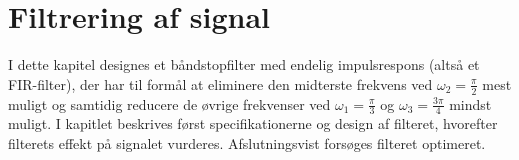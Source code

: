 \chapter{Filtrering af signal}
I dette kapitel designes et båndstopfilter med endelig impulsrespons (altså et FIR-filter), der har til formål at eliminere den midterste frekvens ved $\omega_2 = \frac{\pi}{2}$ mest muligt og samtidig reducere de øvrige frekvenser ved $\omega_1 = \frac{\pi}{3}$ og $\omega_3 = \frac{3\pi}{4}$ mindst muligt. I kapitlet beskrives først specifikationerne og design af filteret, hvorefter filterets effekt på signalet vurderes. Afslutningsvist forsøges filteret optimeret.



%
